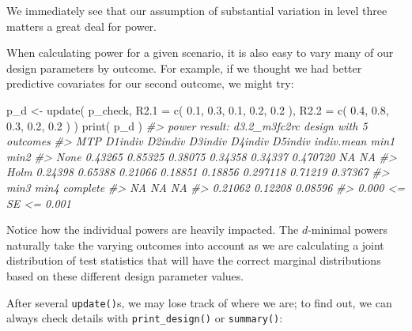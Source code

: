 \documentclass{article}
\newenvironment{Shaded}{\begin{snugshade}}{\end{snugshade}}
\newcommand{\AttributeTok}[1]{\textcolor[rgb]{0.77,0.63,0.00}{#1}}
\newcommand{\CommentTok}[1]{\textcolor[rgb]{0.56,0.35,0.01}{\textit{#1}}}
\newcommand{\FloatTok}[1]{\textcolor[rgb]{0.00,0.00,0.81}{#1}}
\newcommand{\FunctionTok}[1]{\textcolor[rgb]{0.00,0.00,0.00}{#1}}
\newcommand{\NormalTok}[1]{#1}
\newcommand{\OtherTok}[1]{\textcolor[rgb]{0.56,0.35,0.01}{#1}}
\begin{document}
We immediately see that our assumption of substantial variation in level
three matters a great deal for power.

When calculating power for a given scenario, it is also easy to vary
many of our design parameters by outcome. For example, if we thought we
had better predictive covariates for our second outcome, we might try:

\begin{Shaded}
\begin{Highlighting}[]
\NormalTok{p\_d }\OtherTok{\textless{}{-}} \FunctionTok{update}\NormalTok{( p\_check,}
               \AttributeTok{R2.1 =} \FunctionTok{c}\NormalTok{( }\FloatTok{0.1}\NormalTok{, }\FloatTok{0.3}\NormalTok{, }\FloatTok{0.1}\NormalTok{, }\FloatTok{0.2}\NormalTok{, }\FloatTok{0.2}\NormalTok{ ),}
               \AttributeTok{R2.2 =} \FunctionTok{c}\NormalTok{( }\FloatTok{0.4}\NormalTok{, }\FloatTok{0.8}\NormalTok{, }\FloatTok{0.3}\NormalTok{, }\FloatTok{0.2}\NormalTok{, }\FloatTok{0.2}\NormalTok{ ) )}
\FunctionTok{print}\NormalTok{( p\_d )}
\CommentTok{\#\textgreater{} power result: d3.2\_m3fc2rc design with 5 outcomes}
\CommentTok{\#\textgreater{}   MTP D1indiv D2indiv D3indiv D4indiv D5indiv indiv.mean    min1    min2}
\CommentTok{\#\textgreater{}  None 0.43265 0.85325 0.38075 0.34358 0.34337   0.470720      NA      NA}
\CommentTok{\#\textgreater{}  Holm 0.24398 0.65388 0.21066 0.18851 0.18856   0.297118 0.71219 0.37367}
\CommentTok{\#\textgreater{}     min3    min4 complete}
\CommentTok{\#\textgreater{}       NA      NA       NA}
\CommentTok{\#\textgreater{}  0.21062 0.12208  0.08596}
\CommentTok{\#\textgreater{}  0.000 \textless{}= SE \textless{}= 0.001}
\end{Highlighting}
\end{Shaded}

Notice how the individual powers are heavily impacted. The \(d\)-minimal
powers naturally take the varying outcomes into account as we are
calculating a joint distribution of test statistics that will have the
correct marginal distributions based on these different design parameter
values.

After several \texttt{update()}s, we may lose track of where we are; to
find out, we can always check details with \texttt{print\_design()} or
\texttt{summary()}:
\end{document}
